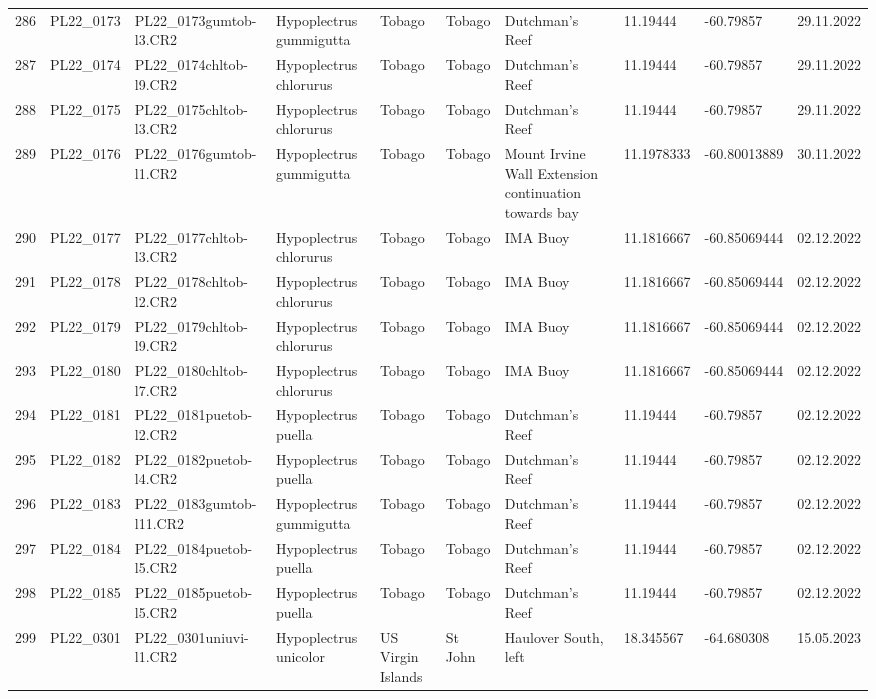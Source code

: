 \begin{table}[ht]
\begin{tabular}{rlllllllll}
  286 & PL22\_0173 & PL22\_0173gumtob-l3.CR2 & Hypoplectrus gummigutta & Tobago & Tobago & Dutchman's Reef & 11.19444 & -60.79857 & 29.11.2022 \\ 
  287 & PL22\_0174 & PL22\_0174chltob-l9.CR2 & Hypoplectrus chlorurus & Tobago & Tobago & Dutchman's Reef & 11.19444 & -60.79857 & 29.11.2022 \\ 
  288 & PL22\_0175 & PL22\_0175chltob-l3.CR2 & Hypoplectrus chlorurus & Tobago & Tobago & Dutchman's Reef & 11.19444 & -60.79857 & 29.11.2022 \\ 
  289 & PL22\_0176 & PL22\_0176gumtob-l1.CR2 & Hypoplectrus gummigutta & Tobago & Tobago & Mount Irvine Wall Extension continuation towards bay & 11.1978333 & -60.80013889 & 30.11.2022 \\ 
  290 & PL22\_0177 & PL22\_0177chltob-l3.CR2 & Hypoplectrus chlorurus & Tobago & Tobago & IMA Buoy & 11.1816667 & -60.85069444 & 02.12.2022 \\ 
  291 & PL22\_0178 & PL22\_0178chltob-l2.CR2 & Hypoplectrus chlorurus & Tobago & Tobago & IMA Buoy & 11.1816667 & -60.85069444 & 02.12.2022 \\ 
  292 & PL22\_0179 & PL22\_0179chltob-l9.CR2 & Hypoplectrus chlorurus & Tobago & Tobago & IMA Buoy & 11.1816667 & -60.85069444 & 02.12.2022 \\ 
  293 & PL22\_0180 & PL22\_0180chltob-l7.CR2 & Hypoplectrus chlorurus & Tobago & Tobago & IMA Buoy & 11.1816667 & -60.85069444 & 02.12.2022 \\ 
  294 & PL22\_0181 & PL22\_0181puetob-l2.CR2 & Hypoplectrus puella & Tobago & Tobago & Dutchman's Reef & 11.19444 & -60.79857 & 02.12.2022 \\ 
  295 & PL22\_0182 & PL22\_0182puetob-l4.CR2 & Hypoplectrus puella & Tobago & Tobago & Dutchman's Reef & 11.19444 & -60.79857 & 02.12.2022 \\ 
  296 & PL22\_0183 & PL22\_0183gumtob-l11.CR2 & Hypoplectrus gummigutta & Tobago & Tobago & Dutchman's Reef & 11.19444 & -60.79857 & 02.12.2022 \\ 
  297 & PL22\_0184 & PL22\_0184puetob-l5.CR2 & Hypoplectrus puella & Tobago & Tobago & Dutchman's Reef & 11.19444 & -60.79857 & 02.12.2022 \\ 
  298 & PL22\_0185 & PL22\_0185puetob-l5.CR2 & Hypoplectrus puella & Tobago & Tobago & Dutchman's Reef & 11.19444 & -60.79857 & 02.12.2022 \\ 
  299 & PL22\_0301 & PL22\_0301uniuvi-l1.CR2 & Hypoplectrus unicolor & US Virgin Islands & St John & Haulover South, left & 18.345567 & -64.680308 & 15.05.2023 \\ 

\end{tabular}
\end{table}
